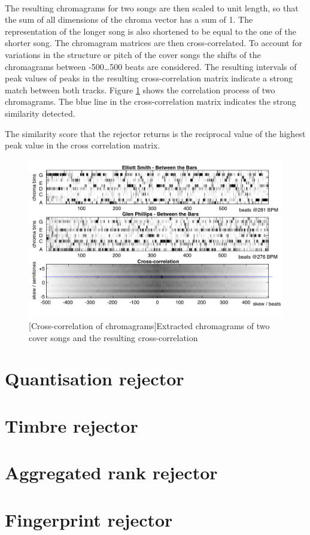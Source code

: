 \paragraph{}
The resulting chromagrams for two songs are then scaled to unit length, so that
the sum of all dimensions of the chroma vector has a sum of 1. The
representation of the longer song is also shortened to be equal to the one of
the shorter song. The chromagram matrices are then cross-correlated. To account
for variations in the structure or pitch of the cover songs the shifts of the
chromagrams between -500\dots500 beats are considered. The resulting intervals
of peak values of peaks in the resulting cross-correlation matrix indicate a
strong match between both tracks. Figure \ref{fig:cross-correlation} shows the
correlation process of two chromagrams. The blue line in the cross-correlation
matrix indicates the strong similarity detected.

The similarity score that the rejector returns is the reciprocal value of the
highest peak value in the cross correlation matrix.

\begin{figure}
    \centering
    \includegraphics[width=\textwidth]{Algorithms/cross-correlation.png}
    [Cross-correlation of chromagrams]{Extracted chromagrams of two cover songs and the resulting cross-correlation \cite{ellis2007identifyingcover}}
    \label{fig:cross-correlation}
\end{figure}

\section{Quantisation rejector}
\label{sec:ccs}




\section{Timbre rejector} 
\label{sec:quantisation}
\section{Aggregated rank rejector} 
\label{sec:timbre}
\section{Fingerprint rejector} 
\label{sec:rankaggregation}

